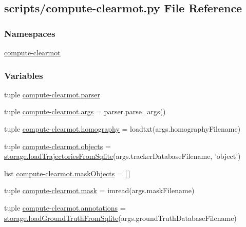 \hypertarget{compute-clearmot_8py}{\subsection{scripts/compute-\/clearmot.py File Reference}
\label{compute-clearmot_8py}
}
\subsubsection*{Namespaces}
\begin{DoxyCompactItemize}
\item 
\hyperlink{namespacecompute-clearmot}{compute-\/clearmot}
\end{DoxyCompactItemize}
\subsubsection*{Variables}
\begin{DoxyCompactItemize}
\item 
tuple \hyperlink{namespacecompute-clearmot_ad3bd2e52122d02473330a4fbe63b978a}{compute-\/clearmot.\-parser}
\item 
tuple \hyperlink{namespacecompute-clearmot_a47a5abb52dee7ddad848f2fad0a0b9b5}{compute-\/clearmot.\-args} = parser.\-parse\-\_\-args()
\item 
tuple \hyperlink{namespacecompute-clearmot_a5edb0e829730c5829319525b889bd397}{compute-\/clearmot.\-homography} = loadtxt(args.\-homography\-Filename)
\item 
tuple \hyperlink{namespacecompute-clearmot_a4ebfb33f7f61805c131e08b6c021827d}{compute-\/clearmot.\-objects} = \hyperlink{namespacestorage_aaafba9f6bc0816ff0084df5e1d892a9d}{storage.\-load\-Trajectories\-From\-Sqlite}(args.\-tracker\-Database\-Filename, 'object')
\item 
list \hyperlink{namespacecompute-clearmot_a4f294254ea03e7d3752d568cb63dc734}{compute-\/clearmot.\-mask\-Objects} = \mbox{[}$\,$\mbox{]}
\item 
tuple \hyperlink{namespacecompute-clearmot_ae649842464dfab87258a46f244b71ca3}{compute-\/clearmot.\-mask} = imread(args.\-mask\-Filename)
\item 
tuple \hyperlink{namespacecompute-clearmot_a1778137e8796b2628575fc799ae04556}{compute-\/clearmot.\-annotations} = \hyperlink{namespacestorage_aa3adae129d45a66fe22312bd3db7b43c}{storage.\-load\-Ground\-Truth\-From\-Sqlite}(args.\-ground\-Truth\-Database\-Filename)
\end{DoxyCompactItemize}
